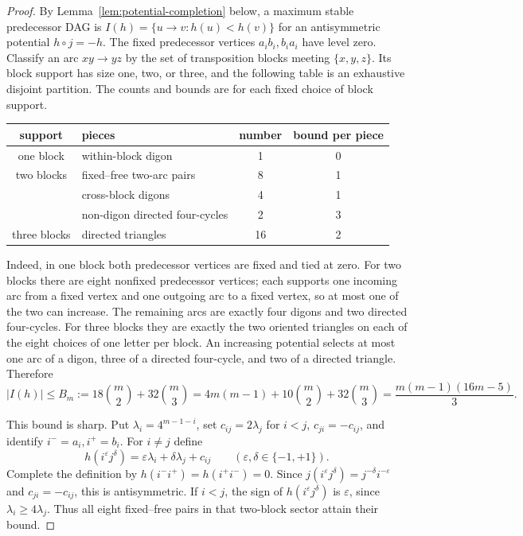 \documentclass[11pt,a4paper]{article}
\theoremstyle{remark}
\begin{document}
\begin{proof}
By Lemma~\ref{lem:potential-completion} below, a maximum stable predecessor
DAG is \(I(h)=\{u\to v:h(u)<h(v)\}\) for an antisymmetric potential
\(h\circ j=-h\).  The fixed predecessor vertices \(a_ib_i,b_ia_i\) have
level zero.  Classify an arc \(xy\to yz\) by the set of transposition blocks
meeting \(\{x,y,z\}\).  Its block support has size one, two, or three, and
the following table is an exhaustive disjoint partition.  The counts and
bounds are for each fixed choice of block support.
\begin{center}
\begin{tabularx}{\textwidth}{@{}cXcc@{}}
\toprule
support & pieces & number & bound per piece\\
\midrule
one block & within-block digon & 1 & 0\\
two blocks & fixed--free two-arc pairs & 8 & 1\\
           & cross-block digons & 4 & 1\\
           & non-digon directed four-cycles & 2 & 3\\
three blocks & directed triangles & 16 & 2\\
\bottomrule
\end{tabularx}
\end{center}
Indeed, in one block both predecessor vertices are fixed and tied at zero.
For two blocks there are eight nonfixed predecessor vertices; each supports
one incoming arc from a fixed vertex and one outgoing arc to a fixed vertex,
so at most one of the two can increase.  The remaining arcs are exactly four
digons and two directed four-cycles.  For three blocks they are exactly the
two oriented triangles on each of the eight choices of one letter per block.
An increasing potential selects at most one arc of a digon, three of a
directed four-cycle, and two of a directed triangle.  Therefore
\[
 |I(h)|\leq B_m:=18\binom m2+32\binom m3
 =4m(m-1)+10\binom m2+32\binom m3
 =\frac{m(m-1)(16m-5)}3.                           \tag{4.1}
\]

This bound is sharp.  Put \(\lambda_i=4^{m-1-i}\), set
\(c_{ij}=2\lambda_j\) for \(i<j\), \(c_{ji}=-c_{ij}\), and identify
\(i^-=a_i,i^+=b_i\).  For \(i\ne j\) define
\[
 h(i^\varepsilon j^\delta)
 =\varepsilon\lambda_i+\delta\lambda_j+c_{ij}
 \qquad(\varepsilon,\delta\in\{-1,+1\}).             \tag{4.2}
\]
Complete the definition by
\(h(i^-i^+)=h(i^+i^-)=0\).  Since
\(j(i^\varepsilon j^\delta)=j^{-\delta}i^{-\varepsilon}\) and
\(c_{ji}=-c_{ij}\), this is antisymmetric.  If \(i<j\), the sign of
\(h(i^\varepsilon j^\delta)\) is \(\varepsilon\), since
\(\lambda_i\geq4\lambda_j\).  Thus all eight fixed--free pairs in that
two-block sector attain their bound.


\end{proof}
\end{document}
